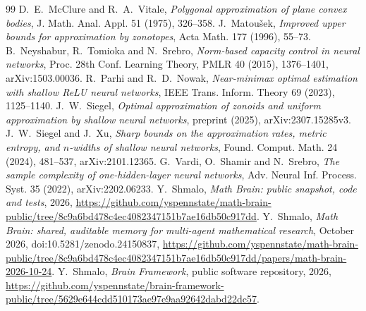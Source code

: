 \documentclass[11pt]{amsart}
\theoremstyle{definition}
\theoremstyle{remark}
\numberwithin{equation}{section}
\begin{document}
\begin{thebibliography}{99}
 D.~E.~McClure and R.~A.~Vitale, \emph{Polygonal approximation of plane convex bodies}, J. Math. Anal. Appl. 51 (1975), 326--358.
 J.~Matou\v{s}ek, \emph{Improved upper bounds for approximation by zonotopes}, Acta Math. 177 (1996), 55--73.
 B.~Neyshabur, R.~Tomioka and N.~Srebro, \emph{Norm-based capacity control in neural networks}, Proc. 28th Conf. Learning Theory, PMLR 40 (2015), 1376--1401, arXiv:1503.00036.
 R.~Parhi and R.~D.~Nowak, \emph{Near-minimax optimal estimation with shallow ReLU neural networks}, IEEE Trans. Inform. Theory 69 (2023), 1125--1140.
 J.~W.~Siegel, \emph{Optimal approximation of zonoids and uniform approximation by shallow neural networks}, preprint (2025), arXiv:2307.15285v3.
 J.~W.~Siegel and J.~Xu, \emph{Sharp bounds on the approximation rates, metric entropy, and $n$-widths of shallow neural networks}, Found. Comput. Math. 24 (2024), 481--537, arXiv:2101.12365.
 G.~Vardi, O.~Shamir and N.~Srebro, \emph{The sample complexity of one-hidden-layer neural networks}, Adv. Neural Inf. Process. Syst. 35 (2022), arXiv:2202.06233.
 Y.~Shmalo, \emph{Math Brain: public snapshot, code and tests}, 2026, \url{https://github.com/yspennstate/math-brain-public/tree/8c9a6bd478c4ec4082347151b7ae16db50c917dd}.
 Y.~Shmalo, \emph{Math Brain: shared, auditable memory for multi-agent mathematical research}, October 2026, doi:10.5281/zenodo.24150837, \url{https://github.com/yspennstate/math-brain-public/tree/8c9a6bd478c4ec4082347151b7ae16db50c917dd/papers/math-brain-2026-10-24}.
 Y.~Shmalo, \emph{Brain Framework}, public software repository, 2026, \url{https://github.com/yspennstate/brain-framework-public/tree/5629e644cdd510173ae97e9aa92642dabd22dc57}.
\end{thebibliography}
\end{document}
